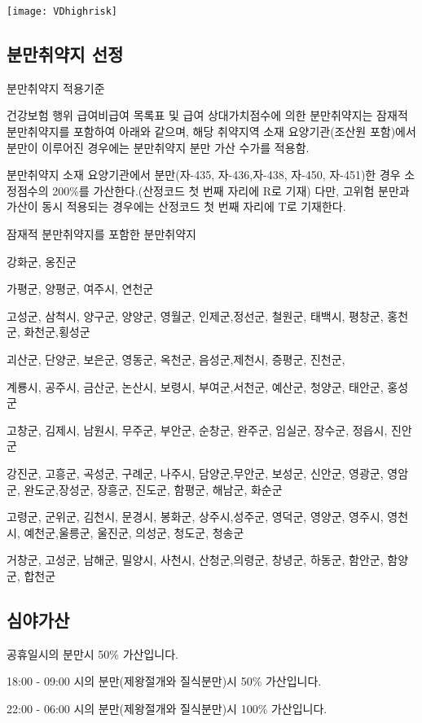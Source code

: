 \texttt{[image: VDhighrisk]}
\subsection{분만취약지 선정}
분만취약지 적용기준 \par
건강보험 행위 급여\bullet 비급여 목록표 및 급여 상대가치점수에 의한 분만취약지는 잠재적 분만취약지를 포함하여 아래와 같으며, 해당 취약지역 소재 요양기관(조산원 포함)에서 분만이 이루어진 경우에는 분만취약지 분만 가산 수가를 적용함. \par
분만취약지 소재 요양기관에서 분만(자-435, 자-436,자-438, 자-450, 자-451)한 경우 소정점수의 200\%를 가산한다.(산정코드 첫 번째 자리에 R로 기재) 다만, 고위험 분만과 가산이 동시 적용되는 경우에는 산정코드 첫 번째 자리에 T로 기재한다. 

\begin{commentbox}{잠재적 분만취약지를 포함한 분만취약지}
\begin{description}\tightlist
\item[인천] 강화군, 옹진군
\item[경기] 가평군, 양평군, 여주시, 연천군
\item[강원] 고성군, 삼척시, 양구군, 양양군, 영월군, 인제군,정선군, 철원군, 태백시, 평창군, 홍천군, 화천군,횡성군
\item[충북] 괴산군, 단양군, 보은군, 영동군, 옥천군, 음성군,제천시, 증평군, 진천군, 
\item[충남] 계룡시, 공주시, 금산군, 논산시, 보령시, 부여군,서천군, 예산군, 청양군, 태안군, 홍성군
\item[전북] 고창군, 김제시, 남원시, 무주군, 부안군, 순창군, 완주군, 임실군, 장수군, 정읍시, 진안군
\item[전남] 강진군, 고흥군, 곡성군, 구례군, 나주시, 담양군,무안군, 보성군, 신안군, 영광군, 영암군, 완도군,장성군, 장흥군, 진도군, 함평군, 해남군, 화순군
\item[경북] 고령군, 군위군, 김천시, 문경시, 봉화군, 상주시,성주군, 영덕군, 영양군, 영주시, 영천시, 예천군,울릉군, 울진군, 의성군, 청도군, 청송군
\item[경남] 거창군, 고성군, 남해군, 밀양시, 사천시, 산청군,의령군, 창녕군, 하동군, 함안군, 함양군, 합천군
\end{description}
\end{commentbox}

\subsection{심야가산}
공휴일시의 분만시 50\% 가산입니다.  \par
18:00 - 09:00 시의 분만(제왕절개와 질식분만)시 50\% 가산입니다. \par
22:00 - 06:00 시의 분만(제왕절개와 질식분만)시 100\% 가산입니다. %

